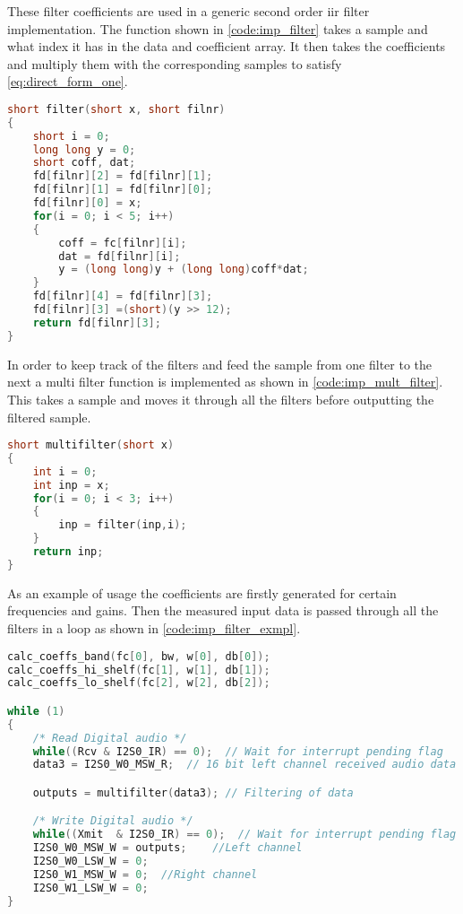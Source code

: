 These filter coefficients are used in a generic second order \gls{iir} filter implementation. The function shown in \autoref{code:imp_filter} takes a sample and what index it has in the data and coefficient array. It then takes the coefficients and multiply them with the corresponding samples to satisfy \autoref{eq:direct_form_one}. 
\begin{lstlisting}[caption={Single second order IIR filter implementation},language=C,label={code:imp_filter},tabsize=2]
short filter(short x, short filnr)
{
	short i = 0;
	long long y = 0;
	short coff, dat;
	fd[filnr][2] = fd[filnr][1];
	fd[filnr][1] = fd[filnr][0];
	fd[filnr][0] = x;
	for(i = 0; i < 5; i++)
	{
		coff = fc[filnr][i];
		dat = fd[filnr][i];
		y = (long long)y + (long long)coff*dat;
	}
	fd[filnr][4] = fd[filnr][3];
	fd[filnr][3] =(short)(y >> 12);
	return fd[filnr][3];
}
\end{lstlisting}

In order to keep track of the filters and feed the sample from one filter to the next a multi filter function is implemented as shown in \autoref{code:imp_mult_filter}. This takes a sample and moves it through all the filters before outputting the filtered sample.
\begin{lstlisting}[caption={Single second order IIR filter implementation},language=C,label={code:imp_mult_filter},tabsize=2]
short multifilter(short x)
{
	int i = 0;
	int inp = x;
	for(i = 0; i < 3; i++)
	{
		inp = filter(inp,i);
	}
	return inp;
}
\end{lstlisting}

As an example of usage the coefficients are firstly generated for certain frequencies and gains. Then the measured input data is passed through all the filters in a loop as shown in \autoref{code:imp_filter_exmpl}.

\begin{lstlisting}[caption={Example usage of filtering functions.},language=C,label={code:imp_filter_exmpl},tabsize=2]
calc_coeffs_band(fc[0], bw, w[0], db[0]);
calc_coeffs_hi_shelf(fc[1], w[1], db[1]);
calc_coeffs_lo_shelf(fc[2], w[2], db[2]);

while (1)
{
	/* Read Digital audio */
	while((Rcv & I2S0_IR) == 0);  // Wait for interrupt pending flag
	data3 = I2S0_W0_MSW_R;  // 16 bit left channel received audio data 

	outputs = multifilter(data3); // Filtering of data

	/* Write Digital audio */
	while((Xmit  & I2S0_IR) == 0);  // Wait for interrupt pending flag
	I2S0_W0_MSW_W = outputs;	//Left channel
	I2S0_W0_LSW_W = 0;
	I2S0_W1_MSW_W = 0;	//Right channel
	I2S0_W1_LSW_W = 0;
}
\end{lstlisting}
